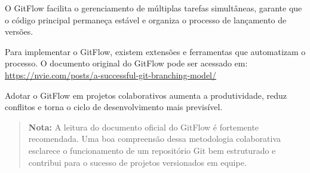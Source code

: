 O GitFlow facilita o gerenciamento de múltiplas tarefas simultâneas, garante que o código principal permaneça estável e organiza o processo de lançamento de versões.

Para implementar o GitFlow, existem extensões e ferramentas que automatizam o processo. O documento original do GitFlow pode ser acessado em: \url{https://nvie.com/posts/a-successful-git-branching-model/}

Adotar o GitFlow em projetos colaborativos aumenta a produtividade, reduz conflitos e torna o ciclo de desenvolvimento mais previsível.

\begin{quote}
\textbf{Nota:}
A leitura do documento oficial do GitFlow é fortemente recomendada. Uma boa compreensão dessa metodologia colaborativa esclarece o funcionamento de um repositório Git bem estruturado e contribui para o sucesso de projetos versionados em equipe.
\end{quote}

